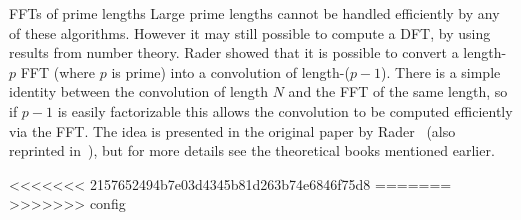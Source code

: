 \documentclass[fleqn,12pt]{article}
\begin{document}
\begin{subsection}{FFTs of prime lengths}
%
  Large prime lengths cannot be handled efficiently by any of these
algorithms. However it may still possible to compute a DFT, by using
results from number theory. Rader showed that it is possible to
convert a length-$p$ FFT (where $p$ is prime) into a convolution of
length-($p-1$).  There is a simple identity between the convolution of
length $N$ and the FFT of the same length, so if $p-1$ is easily
factorizable this allows the convolution to be computed efficiently
via the FFT. The idea is presented in the original paper by
Rader~\cite{raderprimes} (also reprinted in~\cite{mcclellan79}), but
for more details see the theoretical books mentioned earlier.
\end{subsection}





<<<<<<< 2157652494b7e03d4345b81d263b74e6846f75d8
=======
>>>>>>> config


\end{document}
